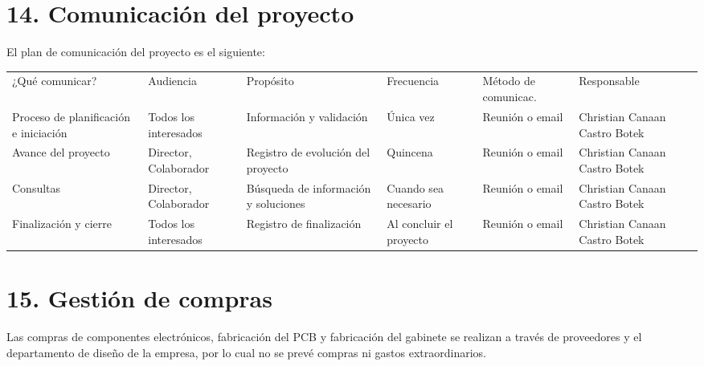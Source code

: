 \documentclass[11pt]{charter}
\begin{document}
\vspace{250px}

\section{14. Comunicación del proyecto}
\label{sec:comunicaciones}

El plan de comunicación del proyecto es el siguiente:

\begin{table}[htpb]
\centering
\begin{tabularx}{\linewidth}{|X|C{1.8cm}|C{3cm}|C{1.8cm}|C{2cm}|C{2.1cm}|}
\hline
{} 
           \\ \hline
{} 
¿Qué comunicar? & Audiencia & Propósito & Frecuencia & Método de comunicac. & Responsable \\ \hline
Proceso de planificación e iniciación  & Todos los interesados & Información y validación & Única vez & Reunión o email & Christian Canaan Castro Botek            \\ \hline
Avance del proyecto & Director, Colaborador & Registro de evolución del proyecto    & Quincena    & Reunión o email   & Christian Canaan Castro Botek             \\ \hline
Consultas  & Director, Colaborador & Búsqueda de información y soluciones         &  Cuando sea necesario  &  Reunión o email  & Christian Canaan Castro Botek            \\ \hline
Finalización y cierre & Todos los interesados   & Registro de finalización        & Al concluir el proyecto  &  Reunión o email & Christian Canaan Castro Botek            \\ \hline

\end{tabularx}
\end{table}

\section{15. Gestión de compras}
\label{sec:compras}

Las compras de componentes electrónicos, fabricación del PCB y fabricación del gabinete se realizan a través de proveedores y el departamento de diseño de la empresa, por lo cual no se prevé compras ni gastos extraordinarios.

\vspace{290px}
 
\end{document}
